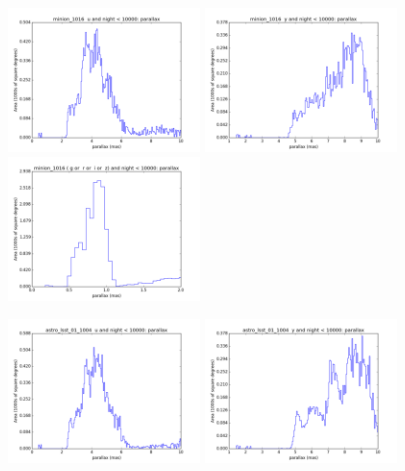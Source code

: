 \begin{figure}[ht]
  \begin{center}
  \includegraphics[width=2.0in]{./figs/milkyway/astromPanels/MW_Astrom_paError_Baseline_u_hst.png}
  \includegraphics[width=2.0in]{./figs/milkyway/astromPanels/MW_Astrom_paError_Baseline_y_hst.png}
  \includegraphics[width=2.0in]{./figs/milkyway/astromPanels/MW_Astrom_paError_Baseline_10y_hst.png}
  \end{center}
  \begin{center}
  \includegraphics[width=2.0in]{./figs/milkyway/astromPanels/MW_Astrom_paError_wfdPlane_u_hst.png}
  \includegraphics[width=2.0in]{./figs/milkyway/astromPanels/MW_Astrom_paError_wfdPlane_y_hst.png}

\end{center}
\end{figure}

